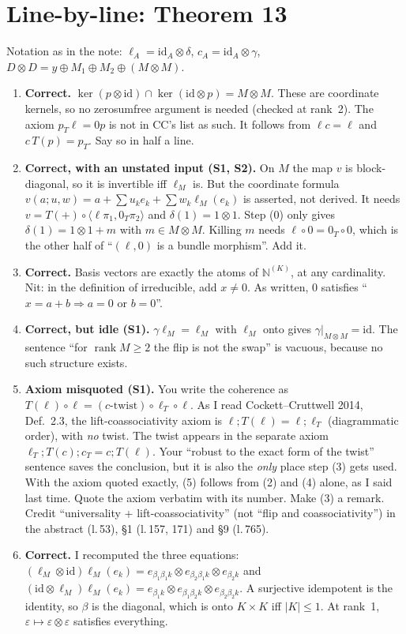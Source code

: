 \documentclass[11pt]{article}
\newcommand{\N}{\mathbb{N}}
\begin{document}
\section{Line-by-line: Theorem 13}
Notation as in the note: $\ell_A=\mathrm{id}_A\otimes\delta$, $c_A=\mathrm{id}_A\otimes\gamma$,
$D\otimes D=y\oplus M_1\oplus M_2\oplus(M\otimes M)$.
\begin{enumerate}[label=(\arabic*),start=0,leftmargin=*]
\item \textbf{Correct.} $\ker(p\otimes\mathrm{id})\cap\ker(\mathrm{id}\otimes p)=M\otimes M$. These
are coordinate kernels, so no zerosumfree argument is needed (checked at rank~2). The axiom
$p_T\ell=0p$ is not in CC's list as such. It follows from $\ell c=\ell$ and $c\,T(p)=p_T$. Say so
in half a line.
\item \textbf{Correct, with an unstated input (S1, S2).} On $M$ the map $v$ is block-diagonal, so it
is invertible iff $\ell_M$ is. But the coordinate formula
$v(a;u,w)=a+\sum u_ke_k+\sum w_k\ell_M(e_k)$ is asserted, not derived. It needs
$v=T(+)\circ\langle\ell\pi_1,0_T\pi_2\rangle$ and $\delta(1)=1\otimes1$. Step (0) only gives
$\delta(1)=1\otimes1+m$ with $m\in M\otimes M$. Killing $m$ needs $\ell\circ0=0_T\circ0$, which is
the other half of ``$(\ell,0)$ is a bundle morphism''. Add it.
\item \textbf{Correct.} Basis vectors are exactly the atoms of $\N^{(K)}$, at any cardinality.
Nit: in the definition of irreducible, add $x\neq0$. As written, $0$ satisfies
``$x=a+b\Rightarrow a=0$ or $b=0$''.
\item \textbf{Correct, but idle (S1).} $\gamma\ell_M=\ell_M$ with $\ell_M$ onto gives
$\gamma|_{M\otimes M}=\mathrm{id}$. The sentence ``for $\operatorname{rank}M\ge2$ the flip is not
the swap'' is vacuous, because no such structure exists.
\item \textbf{Axiom misquoted (S1).} You write the coherence as
$T(\ell)\circ\ell=(c\text{-twist})\circ\ell_T\circ\ell$. As I read Cockett--Cruttwell 2014,
Def.~2.3, the lift-coassociativity axiom is $\ell;T(\ell)=\ell;\ell_T$ (diagrammatic order), with
\emph{no} twist. The twist appears in the separate axiom $\ell_T;T(c);c_T=c;T(\ell)$. Your
``robust to the exact form of the twist'' sentence saves the conclusion, but it is also the
\emph{only} place step (3) gets used. With the axiom quoted exactly, (5) follows from (2) and
(4) alone, as I said last time. Quote the axiom verbatim with its number. Make (3) a remark.
Credit ``universality + lift-coassociativity'' (not ``flip and coassociativity'') in the abstract
(l.\,53), \S1 (l.\,157, 171) and \S9 (l.\,765).
\item \textbf{Correct.} I recomputed the three equations:
$(\ell_M\otimes\mathrm{id})\ell_M(e_k)=e_{\beta_1\beta_1k}\otimes e_{\beta_2\beta_1k}\otimes e_{\beta_2k}$
and
$(\mathrm{id}\otimes\ell_M)\ell_M(e_k)=e_{\beta_1k}\otimes e_{\beta_1\beta_2k}\otimes e_{\beta_2\beta_2k}$.
A surjective idempotent is the identity, so $\beta$ is the diagonal, which is onto $K\times K$ iff
$|K|\le1$. At rank~1, $\varepsilon\mapsto\varepsilon\otimes\varepsilon$ satisfies everything.
\end{enumerate}
\end{document}
